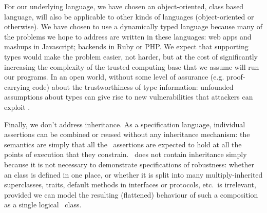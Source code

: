 For our underlying language, we have chosen an object-oriented, class based language,
 will also be
applicable to other kinds of languages (object-oriented or
otherwise).
%
We have chosen to use a dynamically typed language because many of the
problems we hope to address are written in these
languages: web apps and mashups in Javascript; backends in Ruby or
PHP.  We expect that supporting types would make the problem easier,
not harder, but at the cost of significantly increasing the complexity
of the trusted computing base that we assume will run our programs. In
an open world, without some level of assurance (e.g. proof-carrying
code) about the trustworthiness of type information: unfounded
assumptions about types can give rise to new vulnerabilities that
attackers can exploit \cite{pickles}.

Finally, we don't address inheritance. As a specification language,
individual \Chainmail assertions can be combined or reused without any
inheritance mechanism: the semantics are simply that all
the \Chainmail\ assertions are expected to hold at all the points of
execution that they constrain.  \LangOO\ does not contain inheritance
simply because it is not necessary to demonstrate specifications of
robustness: whether an \LangOO class is defined in one place, or
whether it is split into many multiply-inherited superclasses, traits,
default methods in interfaces or protocols, etc.\ is irrelevant,
provided we can model the resulting (flattened) behaviour of such a
composition as a single logical \LangOO\ class.

